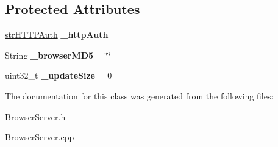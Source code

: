 \subsection*{Protected Attributes}
\begin{DoxyCompactItemize}
\item 
\hypertarget{class_browser_server_class_a4d77215511eb57d5f4744b19ed514c68}{\hyperlink{structstr_h_t_t_p_auth}{str\-H\-T\-T\-P\-Auth} {\bfseries \-\_\-http\-Auth}}\label{class_browser_server_class_a4d77215511eb57d5f4744b19ed514c68}

\item 
\hypertarget{class_browser_server_class_ae1081eeac8d05b37e21de77b1f2c30b3}{String {\bfseries \-\_\-browser\-M\-D5} = \char`\"{}\char`\"{}}\label{class_browser_server_class_ae1081eeac8d05b37e21de77b1f2c30b3}

\item 
\hypertarget{class_browser_server_class_aee3440eba639a1d5a0fc797df6bb0ff9}{uint32\-\_\-t {\bfseries \-\_\-update\-Size} = 0}\label{class_browser_server_class_aee3440eba639a1d5a0fc797df6bb0ff9}

\end{DoxyCompactItemize}


The documentation for this class was generated from the following files\-:\begin{DoxyCompactItemize}
\item 
Browser\-Server.\-h\item 
Browser\-Server.\-cpp\end{DoxyCompactItemize}

